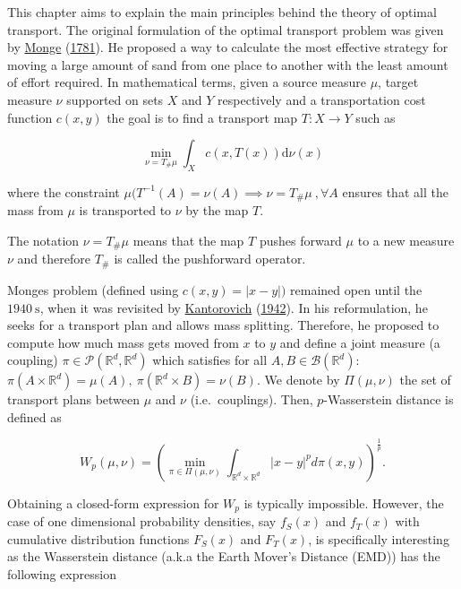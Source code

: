 \documentclass[
  11pt,
]{article}
\begin{document}
This chapter aims to explain the main principles behind the theory of
optimal transport. The original formulation of the optimal transport
problem was given by \protect\hyperlink{ref-monge1781memoire}{Monge}
(\protect\hyperlink{ref-monge1781memoire}{1781}). He proposed a way to
calculate the most effective strategy for moving a large amount of sand
from one place to another with the least amount of effort required. In
mathematical terms, given a source measure \(\mu\), target measure
\(\nu\) supported on sets \(X\) and \(Y\) respectively and a
transportation cost function \(c(x,y)\) the goal is to find a transport
map \(T:X \rightarrow Y\) such as

\[\min _{\nu=T_{\#} \mu} \int_{X} c(x, T(x)) \mathrm{d} \nu(x)\]

where the constraint
\(\mu(T^{-1}(A) = \nu(A) \implies \nu=T_{\#} \mu \ , \forall A\) ensures
that all the mass from \(\mu\) is transported to \(\nu\) by the map
\(T\).

The notation \(\nu=T_{\#} \mu\) means that the map \(T\) pushes forward
\(\mu\) to a new measure \(\nu\) and therefore \(T_{\#}\) is called the
pushforward operator.

Monges problem (defined using \(c(x, y)=|x-y|)\) remained open until the
\(1940 \mathrm{~s}\), when it was revisited by
\protect\hyperlink{ref-kantorovich1942translocation}{Kantorovich}
(\protect\hyperlink{ref-kantorovich1942translocation}{1942}). In his
reformulation, he seeks for a transport plan and allows mass splitting.
Therefore, he proposed to compute how much mass gets moved from \(x\) to
\(y\) and define a joint measure (a coupling)
\(\pi \in \mathcal{P}\left(\mathbb{R}^{d}, \mathbb{R}^{d}\right)\) which
satisfies for all \(A, B \in \mathcal{B}\left(\mathbb{R}^{d}\right)\):
\(\pi\left(A \times \mathbb{R}^{d}\right)=\mu(A), \ \pi\left(\mathbb{R}^{d} \times B\right)=\nu(B).\)
We denote by \(\Pi(\mu, \nu)\) the set of transport plans between
\(\mu\) and \(\nu\) (i.e.~couplings). Then, \(p\)-Wasserstein distance
is defined as

\begin{equation}
W_{p}(\mu, \nu)=\left(\min _{\pi \in \Pi(\mu, \nu)} \int_{\mathbb{R}^{d} \times \mathbb{R}^{d}}|x-y|^{p} d \pi(x, y)\right)^{\frac{1}{p}}.
\end{equation}

Obtaining a closed-form expression for \(W_{p}\) is typically
impossible. However, the case of one dimensional probability densities,
say \(f_{S}(x)\) and \(f_{T}(x)\) with cumulative distribution functions
\(F_{S}(x)\) and \(F_{T}(x)\), is specifically interesting as the
Wasserstein distance (a.k.a the Earth Mover's Distance (EMD)) has the
following expression
\end{document}
